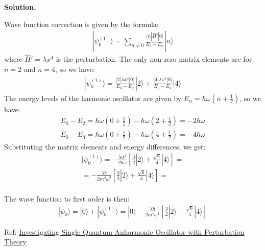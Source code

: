\documentclass[11pt,a4paper]{article}
\newenvironment{solution}{\vspace{1cm} \par\textbf{Solution.} \vspace{1cm}}{\newpage}
\begin{document}
\begin{solution}

Wave function correction is given by the formula:
\begin{align*}
  |\psi_0^{(1)}\rangle = \sum_{n\neq 0} \frac{\langle n | \hat{H}' | 0 \rangle}{E_0 - E_n} |n\rangle
\end{align*}
where $\hat{H}' = \lambda x^4$ is the perturbation. The only non-zero matrix elements are for $n=2$ and $n=4$, so we have:
\begin{align*}
  |\psi_0^{(1)}\rangle = \frac{\langle 2 | \lambda x^4 | 0 \rangle}{E_0 - E_2} |2\rangle + \frac{\langle 4 | \lambda x^4 | 0 \rangle}{E_0 - E_4} |4\rangle
\end{align*}
The energy levels of the harmonic oscillator are given by $E_n = \hbar \omega (n + \frac{1}{2})$, so we have:
\begin{align*}
  E_0 - E_2 = \hbar \omega (0 + \frac{1}{2}) - \hbar \omega (2 + \frac{1}{2}) = -2\hbar \omega \\
  E_0 - E_4 = \hbar \omega (0 + \frac{1}{2}) - \hbar \omega (4 + \frac{1}{2}) = -4\hbar \omega    
\end{align*}
Substituting the matrix elements and energy differences, we get:
\begin{align*}
  |\psi_0^{(1)}\rangle = -\frac{\lambda \alpha^{4}}{2\hbar \omega} \left[\frac{3}{2} |2\rangle + \frac{\sqrt{6}}{4} |4\rangle  \right] = \\
  = -\frac{\lambda \hbar}{2 m^{2} \omega^{3}} \left[\frac{3}{2} |2\rangle + \frac{\sqrt{6}}{4} |4\rangle  \right] = \\
\end{align*}  

The wave function to first order is then:
\begin{align*}
  |\psi_0\rangle = |0\rangle + |\psi_0^{(1)}\rangle = |0\rangle -\frac{\lambda \hbar}{2 m^{2} \omega^{3}} \left[\frac{3}{2} |2\rangle + \frac{\sqrt{6}}{4} |4\rangle  \right]
\end{align*}

Ref: \href{https://dergipark.org.tr/en/download/article-file/3709935}{Investigating Single Quantum Anharmonic Oscillator with Perturbation
Theory}

\end{solution}

\end{document}
